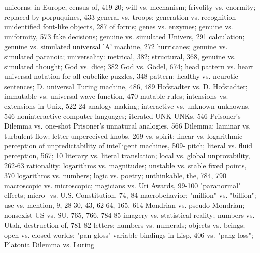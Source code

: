unicorns: in Europe, census of, 419-20;              will vs. mechanism; frivolity vs. enormity;
 replaced by porpuquines, 433                        general vs. troops; generation vs. recognition
unidentified font-like objects, 287                  of forms; genes vs. enzymes; genuine vs.
uniformity, 573                                      fake decisions; genuine vs. simulated
Univers, 291                                         calculation; genuine vs. simulated
universal 'A' machine, 272                           hurricanes; genuine vs. simulated paranoia;
universality: metrical, 382; structural, 368,        genuine vs. simulated thought; God vs. dice;
 382                                                 God vs. Gödel, 674; head pattern vs. heart
universal notation for all cubelike puzzles, 348     pattern; healthy vs. neurotic sentences; D.
universal Turing machine, 486, 489                   Hofstadter vs. D. Hofstadter; immutable vs.
universal wave function, 470                         mutable rules; intensions vs. extensions in
Unix, 522-24                                         analogy-making; interactive vs.
unknown unknowns, 546                                noninteractive computer languages; iterated
UNK-UNKs, 546                                        Prisoner's Dilemma vs. one-shot Prisoner's
unnatural analogies, 566                             Dilemma; laminar vs. turbulent flow; letter
unperceived knobs, 269                               vs. spirit; linear vs. logarithmic perception of
unpredictability of intelligent machines, 509-       pitch; literal vs. fluid perception, 567;
 10                                                  literary vs. literal translation; local vs. global
unprovability, 262-63                                rationality; logarithms vs. magnitudes;
unstable vs. stable fixed points, 370                logarithms vs. numbers; logic vs. poetry;
 unthinkable, the, 784, 790                          macroscopic vs. microscopic; magicians vs.
Uri Awards, 99-100                                   "paranormal" effects; micro- vs.
U.S. Constitution, 74, 84                            macrobehavior; "million" vs. "billion";
use vs. mention, 9, 28-30, 43, 62-64, 165, 614       Mondrian vs. pseudo-Mondrian; nonsexist
US vs. SU, 765, 766. 784-85                          imagery vs. statistical reality; numbers vs.
Utah, destruction of, 781-82                         letters; numbers vs. numerals; objects vs.
                                                     beings; open vs. closed worlds; "pan-gloss"
variable bindings in Lisp, 406                       vs. "pang-loss"; Platonia Dilemma vs. Luring

